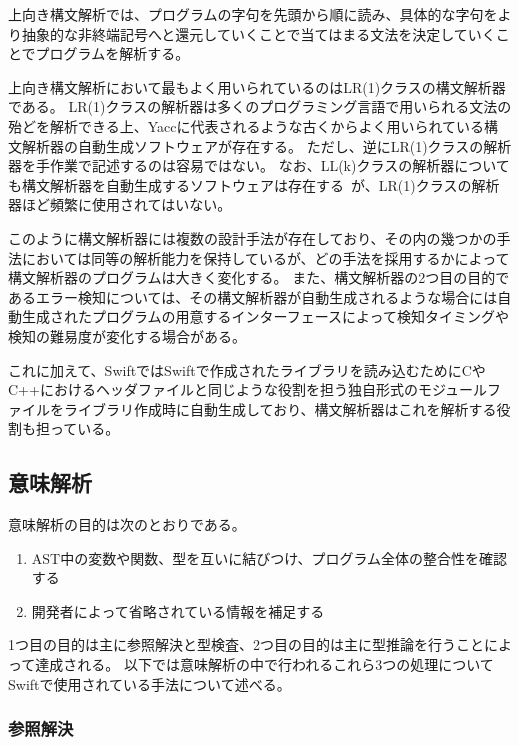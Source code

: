 上向き構文解析では、プログラムの字句を先頭から順に読み、具体的な字句をより抽象的な非終端記号へと還元していくことで当てはまる文法を決定していくことでプログラムを解析する。

上向き構文解析において最もよく用いられているのはLR(1)クラスの構文解析器である。
LR(1)クラスの解析器は多くのプログラミング言語で用いられる文法の殆どを解析できる上、Yaccに代表されるような古くからよく用いられている構文解析器の自動生成ソフトウェアが存在する。
ただし、逆にLR(1)クラスの解析器を手作業で記述するのは容易ではない。
なお、LL(k)クラスの解析器についても構文解析器を自動生成するソフトウェアは存在する~\cite{antlr}が、LR(1)クラスの解析器ほど頻繁に使用されてはいない。

\vspace{2em}

このように構文解析器には複数の設計手法が存在しており、その内の幾つかの手法においては同等の解析能力を保持しているが、どの手法を採用するかによって構文解析器のプログラムは大きく変化する。
また、構文解析器の2つ目の目的であるエラー検知については、その構文解析器が自動生成されるような場合には自動生成されたプログラムの用意するインターフェースによって検知タイミングや検知の難易度が変化する場合がある。

これに加えて、SwiftではSwiftで作成されたライブラリを読み込むためにCやC++におけるヘッダファイルと同じような役割を担う独自形式のモジュールファイルをライブラリ作成時に自動生成しており、構文解析器はこれを解析する役割も担っている。

\subsection{意味解析}
\label{refinement:structure:sema}

意味解析の目的は次のとおりである。

\begin{enumerate}
    \item AST中の変数や関数、型を互いに結びつけ、プログラム全体の整合性を確認する
    \item 開発者によって省略されている情報を補足する
\end{enumerate}

1つ目の目的は主に参照解決と型検査、2つ目の目的は主に型推論を行うことによって達成される。
以下では意味解析の中で行われるこれら3つの処理についてSwiftで使用されている手法について述べる。

\subsubsection{参照解決}

